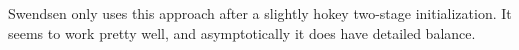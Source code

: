 \documentclass[letterpaper,twocolumn,amsmath,amssymb,pre,aps,10pt]{revtex4-1}
\begin{document}
Swendsen only uses this approach after a slightly hokey two-stage
initialization.  It seems to work pretty well, and asymptotically it
does have detailed balance.

\newpage






\end{document}
